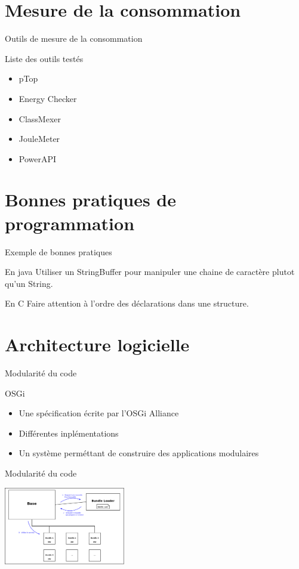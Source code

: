 \documentclass{beamer}
\begin{document}
    \section{Mesure de la consommation}
	\begin{frame}{Outils de mesure de la consommation}
	    \begin{block}{Liste des outils testés}
		\begin{itemize}
		    \item pTop
		    \item Energy Checker
		    \item ClassMexer
		    \item JouleMeter
		    \item PowerAPI
		\end{itemize}
	    \end{block}	
	\end{frame}
	
	
    \section{Bonnes pratiques de programmation}
	\begin{frame}{Exemple de bonnes pratiques}
    	    \begin{block}{En java}
		Utiliser un StringBuffer pour manipuler une chaine de caractère plutot qu'un String.
	    \end{block}
    	    \begin{block}{En C}
		Faire attention à l'ordre des déclarations dans une structure.
	    \end{block}
	\end{frame}
	
    \section{Architecture logicielle}
	\begin{frame}{Modularité du code}
	    \begin{block}{OSGi}
		\begin{itemize}
		    \item Une spécification écrite par l'OSGi Alliance
		    \item Différentes inplémentations
		    \item Un système perméttant de construire des applications modulaires
		\end{itemize}
	    \end{block}
	\end{frame}
	\begin{frame}{Modularité du code}
	    \begin{center}
		\includegraphics[width=200px]{../../Figures/OSGi/EcoPattern_General_Figure.png}
	    \end{center}
	\end{frame}
	
\end{document}
